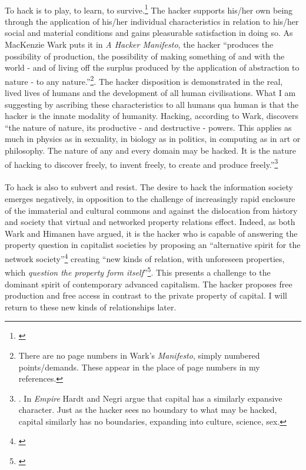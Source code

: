 \documentclass[11pt,titlepage]{book}
\begin{document}
\paragraph{}To hack is to play, to learn, to survive.\footnote{\cite[pp. 48-53 and the prologue `Linus's Law']{himanen:2001he}} The hacker supports his/her own being through the application of his/her individual characteristics in relation to his/her social and material conditions and gains pleasurable satisfaction in doing so. As MacKenzie Wark puts it in \textit{A Hacker Manifesto}, the hacker ``produces the possibility of production, the possibility of making something of and with the world - and of living off the surplus produced by the application of abstraction to nature - to any nature.''\footnote{\cite[077]{wark:2004hm} There are no page numbers in Wark's \textit{Manifesto}, simply numbered points/demands. These appear in the place of page numbers in my references.}. The hacker disposition is demonstrated in the real, lived lives of humans and the development of all human civilisations. What I am suggesting by ascribing these characteristics to all humans qua human is that the hacker is the innate modality of humanity. Hacking, according to Wark, discovers ``the nature of nature, its productive - and destructive - powers. This applies as much in physics as in sexuality, in biology as in politics, in computing as in art or philosophy. The nature of any and every domain may be hacked. It is the nature of hacking to discover freely, to invent freely, to create and produce freely.''\footnote{\cite[076]{wark:2004hm}. In \textit{Empire} Hardt and Negri argue that capital has a similarly expansive character. Just as the hacker sees no boundary to what may be hacked, capital similarly has no boundaries, expanding into culture, science, sex.}

\paragraph{}To hack is also to subvert and resist. The desire to hack the information society emerges negatively, in opposition to the challenge of increasingly rapid enclosure of the immaterial and cultural commons and against the dislocation from history and society that virtual and networked property relations effect. Indeed, as both Wark and Himanen have argued, it is the hacker who is capable of answering the property question in capitalist societies by proposing an ``alternative spirit for the network society''\footnote{\cite[p. 12]{himanen:2001he}} creating ``new kinds of relation, with unforeseen properties, which \textit{question the property form itself}''\footnote{\cite[036, emphasis added.]{wark:2004hm}}. This presents a challenge to the dominant spirit of contemporary advanced capitalism. The hacker proposes free production and free access in contrast to the private property of capital. I will return to these new kinds of relationships later.
\end{document}
